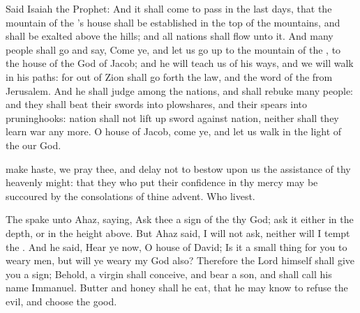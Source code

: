  Said Isaiah the Prophet: And it shall come to pass in the last days, that the mountain of the 's house shall be established in the top of the mountains, and shall be exalted above the hills; and all nations shall flow unto it. And many people shall go and say, Come ye, and let us go up to the mountain of the , to the house of the God of Jacob; and he will teach us of his ways, and we will walk in his paths: for out of Zion shall go forth the law, and the word of the  from Jerusalem. And he shall judge among the nations, and shall rebuke many people: and they shall beat their swords into plowshares, and their spears into pruninghooks: nation shall not lift up sword against nation, neither shall they learn war any more. O house of Jacob, come ye, and let us walk in the light of the  our God. %
\\


\collect
{} make haste, we pray thee, and delay not to bestow upon us the assistance of thy heavenly might: that they who put their confidence in thy mercy may be succoured by the consolations of thine advent. Who livest.

 The  spake unto Ahaz, saying, Ask thee a sign of the  thy God; ask it either in the depth, or in the height above. But Ahaz said, I will not ask, neither will I tempt the . And he said, Hear ye now, O house of David; Is it a small thing for you to weary men, but will ye weary my God also? Therefore the Lord himself shall give you a sign; Behold, a virgin shall conceive, and bear a son, and shall call his name Immanuel. Butter and honey shall he eat, that he may know to refuse the evil, and choose the good.

\clearpage


